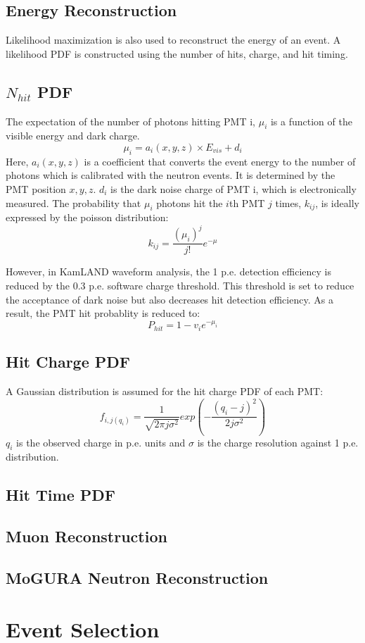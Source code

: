 \subsection{Energy Reconstruction}
Likelihood maximization is also used to reconstruct the energy of an event. A likelihood PDF is constructed using the number of hits, charge, and hit timing.
\subsection*{$N_{hit}$ PDF}
The expectation of the number of photons hitting PMT i, $\mu_i$ is a function of the visible energy and dark charge.
\begin{equation}
	\mu_i = a_i(x,y,z)\times E_{vis} +d_i
\end{equation}
Here, $a_i(x,y,z)$ is a coefficient that converts the event energy to the number of photons which is calibrated with the neutron events. It is determined by the PMT position $x,y,z$. $d_i$ is the dark noise charge of PMT i, which is electronically measured. The probability that $\mu_i$ photons hit the $i$th PMT $j$ times, $k_{ij}$, is ideally expressed by the poisson distribution:
\begin{equation}
	k_{ij}=\frac{(\mu_i)^j}{j!}e^{-\mu}
\end{equation}

However, in KamLAND waveform analysis, the 1 p.e. detection efficiency is reduced by the 0.3 p.e. software charge threshold. This threshold is set to reduce the acceptance of dark noise but also decreases hit detection efficiency. As a result, the PMT hit probablity is reduced to:
\begin{equation}
	P_{hit}=1-v_ie^{-\mu_i}
\end{equation}

\subsection*{Hit Charge PDF}
A Gaussian distribution is assumed for the hit charge PDF of each PMT:
\begin{equation}
	f_{i,j(q_i)}=\frac{1}{\sqrt{2\pi j\sigma^2}}exp(-\frac{(q_i-j)^2}{2j\sigma^2})
\end{equation}
$q_i$ is the observed charge in p.e. units and $\sigma$ is  the charge resolution against 1 p.e. distribution.

\subsection*{Hit Time PDF}


\subsection{Muon Reconstruction}
\subsection{MoGURA Neutron Reconstruction}
\section{Event Selection}



